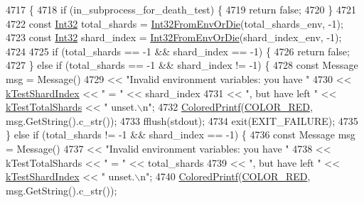 \begin{DoxyCode}
4717                                                     \{
4718   \textcolor{keywordflow}{if} (in\_subprocess\_for\_death\_test) \{
4719     \textcolor{keywordflow}{return} \textcolor{keyword}{false};
4720   \}
4721 
4722   \textcolor{keyword}{const} \hyperlink{namespacetesting_1_1internal_a8ee38faaf875f133358abaf9bc056cec}{Int32} total\_shards = \hyperlink{namespacetesting_1_1internal_aaa576613655c2f380278c255c3ec5fef}{Int32FromEnvOrDie}(total\_shards\_env, -1);
4723   \textcolor{keyword}{const} \hyperlink{namespacetesting_1_1internal_a8ee38faaf875f133358abaf9bc056cec}{Int32} shard\_index = \hyperlink{namespacetesting_1_1internal_aaa576613655c2f380278c255c3ec5fef}{Int32FromEnvOrDie}(shard\_index\_env, -1);
4724 
4725   \textcolor{keywordflow}{if} (total\_shards == -1 && shard\_index == -1) \{
4726     \textcolor{keywordflow}{return} \textcolor{keyword}{false};
4727   \} \textcolor{keywordflow}{else} \textcolor{keywordflow}{if} (total\_shards == -1 && shard\_index != -1) \{
4728     \textcolor{keyword}{const} Message msg = Message()
4729       << \textcolor{stringliteral}{"Invalid environment variables: you have "}
4730       << \hyperlink{namespacetesting_a5f76dfdb8cb2664da54e320ecaba3643}{kTestShardIndex} << \textcolor{stringliteral}{" = "} << shard\_index
4731       << \textcolor{stringliteral}{", but have left "} << \hyperlink{namespacetesting_a7542311baba200ebabd4065717606f6e}{kTestTotalShards} << \textcolor{stringliteral}{" unset.\(\backslash\)n"};
4732     \hyperlink{namespacetesting_1_1internal_adef3055706176001364e54eb73a87e31}{ColoredPrintf}(\hyperlink{namespacetesting_1_1internal_a648c1bc94c2ef9e868ff3f9dff0f9c4ea9ebb3ddab9391781f6ee5021e1e443c3}{COLOR\_RED}, msg.GetString().c\_str());
4733     fflush(stdout);
4734     exit(EXIT\_FAILURE);
4735   \} \textcolor{keywordflow}{else} \textcolor{keywordflow}{if} (total\_shards != -1 && shard\_index == -1) \{
4736     \textcolor{keyword}{const} Message msg = Message()
4737       << \textcolor{stringliteral}{"Invalid environment variables: you have "}
4738       << kTestTotalShards << \textcolor{stringliteral}{" = "} << total\_shards
4739       << \textcolor{stringliteral}{", but have left "} << \hyperlink{namespacetesting_a5f76dfdb8cb2664da54e320ecaba3643}{kTestShardIndex} << \textcolor{stringliteral}{" unset.\(\backslash\)n"};
4740     \hyperlink{namespacetesting_1_1internal_adef3055706176001364e54eb73a87e31}{ColoredPrintf}(\hyperlink{namespacetesting_1_1internal_a648c1bc94c2ef9e868ff3f9dff0f9c4ea9ebb3ddab9391781f6ee5021e1e443c3}{COLOR\_RED}, msg.GetString().c\_str());

\end{DoxyCode}
